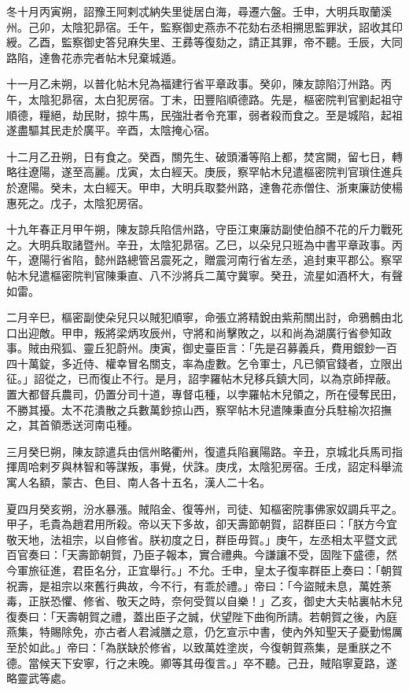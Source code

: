 \begin{pinyinscope}
 冬十月丙寅朔，詔豫王阿剌忒納失里徙居白海，尋遷六盤。壬申，大明兵取蘭溪州。己卯，太陰犯昴宿。壬午，監察御史燕赤不花劾右丞相搠思監罪狀，詔收其印綬。乙酉，監察御史答兒麻失里、王彞等復劾之，請正其罪，帝不聽。壬辰，大同路陷，達魯花赤完者帖木兒棄城遁。



 十一月乙未朔，以普化帖木兒為福建行省平章政事。癸卯，陳友諒陷汀州路。丙午，太陰犯昴宿，太白犯房宿。丁未，田豐陷順德路。先是，樞密院判官劉起祖守順德，糧絕，劫民財，掠牛馬，民強壯者令充軍，弱者殺而食之。至是城陷，起祖遂盡驅其民走於廣平。辛酉，太陰掩心宿。



 十二月乙丑朔，日有食之。癸酉，關先生、破頭潘等陷上都，焚宮闕，留七日，轉略往遼陽，遂至高麗。戊寅，太白經天。庚辰，察罕帖木兒遣樞密院判官瑣住進兵於遼陽。癸未，太白經天。甲申，大明兵取婺州路，達魯花赤僧住、浙東廉訪使楊惠死之。戊子，太陰犯房宿。



 十九年春正月甲午朔，陳友諒兵陷信州路，守臣江東廉訪副使伯顏不花的斤力戰死之。大明兵取諸暨州。辛丑，太陰犯昴宿。乙巳，以朵兒只班為中書平章政事。丙午，遼陽行省陷，懿州路總管呂震死之，贈震河南行省左丞，追封東平郡公。察罕帖木兒遣樞密院判官陳秉直、八不沙將兵二萬守冀寧。癸丑，流星如酒杯大，有聲如雷。



 二月辛巳，樞密副使朵兒只以賊犯順寧，命張立將精銳由紫荊關出討，命鴉鶻由北口出迎敵。甲申，叛將梁炳攻辰州，守將和尚擊敗之，以和尚為湖廣行省參知政事。賊由飛狐、靈丘犯蔚州。庚寅，御史臺臣言：「先是召募義兵，費用銀鈔一百四十萬錠，多近侍、權幸冒名關支，率為虛數。乞令軍士，凡已領官錢者，立限出征。」詔從之，已而復止不行。是月，詔孛羅帖木兒移兵鎮大同，以為京師捍蔽。置大都督兵農司，仍置分司十道，專督屯種，以孛羅帖木兒領之，所在侵奪民田，不勝其擾。太不花潰散之兵數萬鈔掠山西，察罕帖木兒遣陳秉直分兵駐榆次招撫之，其首領悉送河南屯種。



 三月癸巳朔，陳友諒遣兵由信州略衢州，復遣兵陷襄陽路。辛丑，京城北兵馬司指揮周哈剌歹與林智和等謀叛，事覺，伏誅。庚戌，太陰犯房宿。壬戌，詔定科舉流寓人名額，蒙古、色目、南人各十五名，漢人二十名。



 夏四月癸亥朔，汾水暴漲。賊陷金、復等州，司徒、知樞密院事佛家奴調兵平之。甲子，毛貴為趙君用所殺。帝以天下多故，卻天壽節朝賀，詔群臣曰：「朕方今宜敬天地，法祖宗，以自修省。朕初度之日，群臣毋賀。」庚午，左丞相太平暨文武百官奏曰：「天壽節朝賀，乃臣子報本，實合禮典。今謙讓不受，固陛下盛德，然今軍旅征進，君臣名分，正宜舉行。」不允。壬申，皇太子復率群臣上奏曰：「朝賀祝壽，是祖宗以來舊行典故，今不行，有乖於禮。」帝曰：「今盜賊未息，萬姓荼毒，正朕恐懼、修省、敬天之時，奈何受賀以自樂！」乙亥，御史大夫帖裏帖木兒復奏曰：「天壽朝賀之禮，蓋出臣子之誠，伏望陛下曲徇所請。若朝賀之後，內庭燕集，特賜除免，亦古者人君減膳之意，仍乞宣示中書，使內外知聖天子憂勤惕厲至於如此。」帝曰：「為朕缺於修省，以致萬姓塗炭，今復朝賀燕集，是重朕之不德。當候天下安寧，行之未晚。卿等其毋復言。」卒不聽。己丑，賊陷寧夏路，遂略靈武等處。




\end{pinyinscope}
